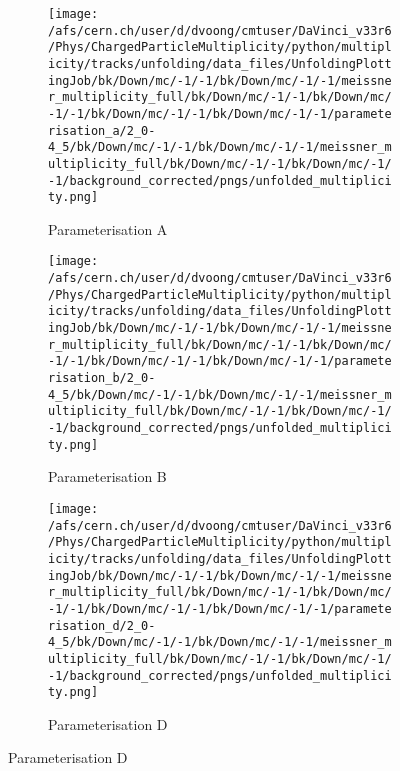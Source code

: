 \begin{figure}[H]
	\begin{subfigure}{0.49\textwidth}
		\texttt{[image: /afs/cern.ch/user/d/dvoong/cmtuser/DaVinci\_v33r6/Phys/ChargedParticleMultiplicity/python/multiplicity/tracks/unfolding/data\_files/UnfoldingPlottingJob/bk/Down/mc/-1/-1/bk/Down/mc/-1/-1/meissner\_multiplicity\_full/bk/Down/mc/-1/-1/bk/Down/mc/-1/-1/bk/Down/mc/-1/-1/bk/Down/mc/-1/-1/parameterisation\_a/2\_0-4\_5/bk/Down/mc/-1/-1/bk/Down/mc/-1/-1/meissner\_multiplicity\_full/bk/Down/mc/-1/-1/bk/Down/mc/-1/-1/background\_corrected/pngs/unfolded\_multiplicity.png]}
		\caption{Parameterisation A}
	\end{subfigure}
	\begin{subfigure}{0.49\textwidth}
		\texttt{[image: /afs/cern.ch/user/d/dvoong/cmtuser/DaVinci\_v33r6/Phys/ChargedParticleMultiplicity/python/multiplicity/tracks/unfolding/data\_files/UnfoldingPlottingJob/bk/Down/mc/-1/-1/bk/Down/mc/-1/-1/meissner\_multiplicity\_full/bk/Down/mc/-1/-1/bk/Down/mc/-1/-1/bk/Down/mc/-1/-1/bk/Down/mc/-1/-1/parameterisation\_b/2\_0-4\_5/bk/Down/mc/-1/-1/bk/Down/mc/-1/-1/meissner\_multiplicity\_full/bk/Down/mc/-1/-1/bk/Down/mc/-1/-1/background\_corrected/pngs/unfolded\_multiplicity.png]}
		\caption{Parameterisation B}
	\end{subfigure}
	\begin{subfigure}{0.49\textwidth}
		\texttt{[image: /afs/cern.ch/user/d/dvoong/cmtuser/DaVinci\_v33r6/Phys/ChargedParticleMultiplicity/python/multiplicity/tracks/unfolding/data\_files/UnfoldingPlottingJob/bk/Down/mc/-1/-1/bk/Down/mc/-1/-1/meissner\_multiplicity\_full/bk/Down/mc/-1/-1/bk/Down/mc/-1/-1/bk/Down/mc/-1/-1/bk/Down/mc/-1/-1/parameterisation\_d/2\_0-4\_5/bk/Down/mc/-1/-1/bk/Down/mc/-1/-1/meissner\_multiplicity\_full/bk/Down/mc/-1/-1/bk/Down/mc/-1/-1/background\_corrected/pngs/unfolded\_multiplicity.png]}
		\caption{Parameterisation D}

\end{subfigure}
\end{figure}
